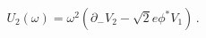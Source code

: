 \begin{equation}
U_2(\omega )=\omega^2 \left( \partial_- V_2 
                            -\sqrt{2} e\phi^* V_1 \right)\,.
\label{U2VV}
\end{equation}

